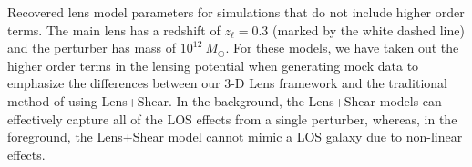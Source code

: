 \label{fig:frontback} Recovered lens model parameters for simulations that do not include higher order terms. The main lens has a redshift of $z_\ell = 0.3$ (marked by the white dashed line) and the perturber has mass of $10^{12}~ M_\odot$. For these models, we have taken out the higher order terms in the lensing potential when generating mock data to emphasize the differences between our 3-D Lens framework and the traditional method of using Lens+Shear. In the background, the Lens+Shear models can effectively capture all of the LOS effects from a single perturber, whereas, in the foreground, the Lens+Shear model cannot mimic a LOS galaxy due to non-linear effects.